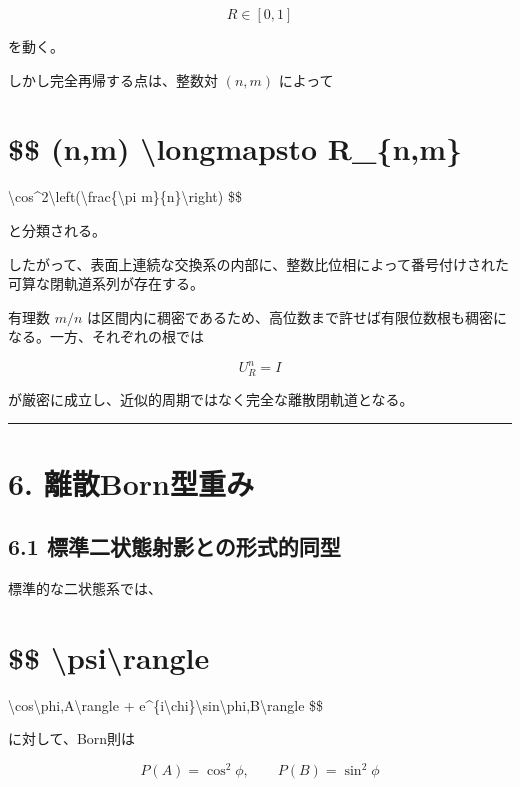 \documentclass[
  a4paper,
  10pt]{article}
\begin{document}
\[
R\in[0,1]
\]

を動く。

しかし完全再帰する点は、整数対 \((n,m)\) によって

\section{\$\$ (n,m) \textbackslash longmapsto
R\_\{n,m\}}\label{-nm-longmapsto-r_nm}

\textbackslash cos\^{}2\textbackslash left(\textbackslash frac\{\textbackslash pi
m\}\{n\}\textbackslash right) \$\$

と分類される。

したがって、表面上連続な交換系の内部に、整数比位相によって番号付けされた可算な閉軌道系列が存在する。

有理数 \(m/n\)
は区間内に稠密であるため、高位数まで許せば有限位数根も稠密になる。一方、それぞれの根では

\[
U_R^n=I
\]

が厳密に成立し、近似的周期ではなく完全な離散閉軌道となる。

\begin{center}\rule{0.5\linewidth}{0.5pt}\end{center}

\section{6. 離散Born型重み}\label{6-ux96e2ux6563bornux578bux91cdux307f}

\subsection{6.1
標準二状態射影との形式的同型}\label{61-ux6a19ux6e96ux4e8cux72b6ux614bux5c04ux5f71ux3068ux306eux5f62ux5f0fux7684ux540cux578b}

標準的な二状態系では、

\section{\$\$
\textbar\textbackslash psi\textbackslash rangle}\label{-psirangle-1}

\textbackslash cos\textbackslash phi,\textbar A\textbackslash rangle +
e\^{}\{i\textbackslash chi\}\textbackslash sin\textbackslash phi,\textbar B\textbackslash rangle
\$\$

に対して、Born則は

\[
P(A)=\cos^2\phi,
\qquad
P(B)=\sin^2\phi
\]
\end{document}
